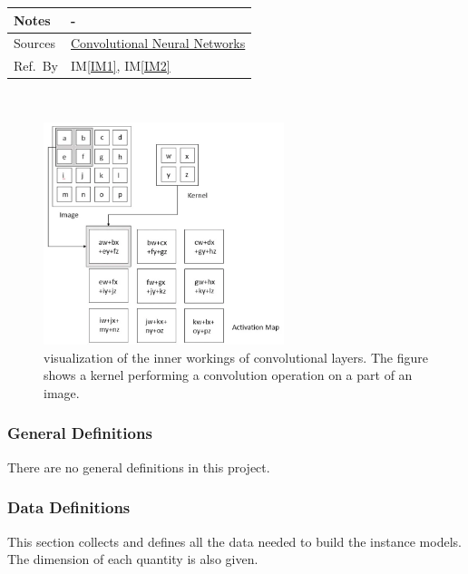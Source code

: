\documentclass[12pt]{article}
\newcommand{\colAwidth}{0.13\textwidth}
\newcommand{\colBwidth}{0.82\textwidth}
\newcommand{\iref}[1]{IM\ref{#1}}
\begin{document}
\begin{minipage}{\textwidth}
\begin{tabular}{| p{\colAwidth} | p{\colBwidth}|}
    \hline
    Notes
             & -                                                                                                                         \\
    \hline
    Sources  & \href{https://towardsdatascience.com/convolutional-neural-networks-explained-9cc5188c4939}{Convolutional Neural Networks} \\
    \hline
    Ref.\ By & \iref{IM1}, \iref{IM2}                                                                                                    \\
    \hline
  \end{tabular}
\end{minipage}\\

\begin{figure}[hbpt!]
  \centering
  \includegraphics[width=70mm]{conv-layer.png}
  \caption{visualization of the inner workings of convolutional layers. The figure shows a kernel performing a convolution operation on
    a part of an image.~\cite{suedumrong2022application}}
  \label{conv-layer}
\end{figure}

\subsubsection{General Definitions}\label{sec_gendef}

There are no general definitions in this project.

\subsubsection{Data Definitions}\label{sec_datadef}

This section collects and defines all the data needed to build the instance
models. The dimension of each quantity is also given.
\end{document}
